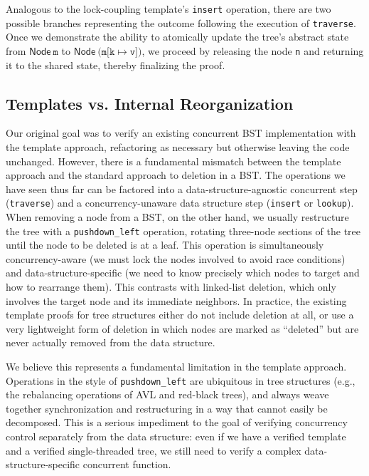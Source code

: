 \documentclass[a4paper,UKenglish,cleveref, autoref, thm-restate]{lipics-v2021}
\newcommand{\treerep}{\ensuremath{\mathsf{Node}}}
\begin{document}
Analogous to the lock-coupling template's \texttt{insert} operation, there are two possible branches representing the outcome following the execution of \texttt{traverse}. Once we demonstrate the ability to atomically update the tree's abstract state from $\treerep \ \texttt{m}$ to $\treerep\ \texttt{(m[k} \mapsto \texttt{v])}$, we proceed by releasing the node \texttt{n} and returning it to the shared state, thereby finalizing the proof.


\subsection{Templates vs. Internal Reorganization}
\label{internal_reorganize}
Our original goal was to verify an existing concurrent BST implementation with the template approach, refactoring as necessary but otherwise leaving the code unchanged. However, there is a fundamental mismatch between the template approach and the standard approach to deletion in a BST. The operations we have seen thus far can be factored into a data-structure-agnostic concurrent step (\lstinline{traverse}) and a concurrency-unaware data structure step (\lstinline{insert} or \lstinline{lookup}). When removing a node from a BST, on the other hand, we usually restructure the tree with a \lstinline{pushdown_left} operation, %
rotating three-node sections of the tree until the node to be deleted is at a leaf. This operation is simultaneously concurrency-aware (we must lock the nodes involved to avoid race conditions) and data-structure-specific (we need to know precisely which nodes to target and how to rearrange them). This contrasts with linked-list deletion, which only involves the target node and its immediate neighbors. In practice, the existing template proofs for tree structures either do not include deletion at all, or use a very lightweight form of deletion in which nodes are marked as ``deleted'' but are never actually removed from the data structure.

We believe this represents a fundamental limitation in the template approach. Operations in the style of \lstinline{pushdown_left} are ubiquitous in tree structures (e.g., the rebalancing operations of AVL and red-black trees), and always weave together synchronization and restructuring in a way that cannot easily be decomposed. This is a serious impediment to the goal of verifying concurrency control separately from the data structure: even if we have a verified template and a verified single-threaded tree, we still need to verify a complex data-structure-specific concurrent function. %
\end{document}
